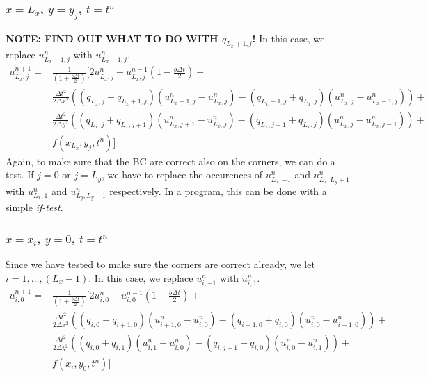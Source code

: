 \documentclass[11pt]{article} %
\newcommand{\Dx}{\Delta x}
\newcommand{\Dy}{\Delta y}
\newcommand{\Dt}{\Delta t}
\newcommand{\unp}{u^{n+1}}
\newcommand{\un}{u^{n}}
\newcommand{\unm}{u^{n-1}}
\begin{document}
\subsubsection{$x=L_x$, $y=y_j$, $t = t^n$}
\textbf{NOTE: FIND OUT WHAT TO DO WITH $q_{L_x+1,j}$!}
In this case, we replace $\un_{L_x+1,j}$ with $\un_{L_x-1,j}$.
\begin{align}
\unp_{L_x,j} = &\frac{1}{\left(1+\frac{b\Dt}{2}\right)}\bigg[ 2\un_{L_x,j} - \unm_{L_x,j}\left(1-\frac{b\Dt}{2}\right) +\nonumber\\
&\frac{\Dt^2}{2\Dx^2}\left((q_{L_x,j} + q_{L_x+1,j})(\un_{L_x-1,j}-\un_{L_x,j}) - (q_{L_x-1,j} + q_{L_x,j})(\un_{L_x,j}-\un_{L_x-1,j})\right) + \nonumber\\
&\frac{\Dt^2}{2\Dy^2}\left((q_{L_x,j} + q_{L_x,j+1})(\un_{L_x,j+1}-\un_{L_x,j}) - (q_{L_x,j-1} + q_{L_x,j})(\un_{L_x,j}-\un_{L_x,j-1})\right) +\nonumber\\
&f(x_{L_x}, y_j, t^n)\bigg]
\end{align}
Again, to make sure that the BC are correct also on the corners, we can do a test. If $j = 0$ or $j=L_y$, we have to replace the occurences of $\un_{L_x,-1}$ and $\un_{L_x,L_y+1}$ with $\un_{L_x,1}$ and $\un_{L_y,L_y-1}$ respectively. In a program, this can be done with a simple \textit{if-test}.

\subsubsection{$x=x_i$, $y=0$, $t=t^n$}
Since we have tested to make sure the corners are correct already, we let $i=1,...,(L_x-1)$.
In this case, we replace $\un_{i,-1}$ with $\un_{i,1}$.
\begin{align}
\unp_{i,0} = &\frac{1}{\left(1+\frac{b\Dt}{2}\right)}\bigg[ 2\un_{i,0} - \unm_{i,0}\left(1-\frac{b\Dt}{2}\right) +\nonumber\\
&\frac{\Dt^2}{2\Dx^2}\left((q_{i,0} + q_{i+1,0})(\un_{i+1,0}-\un_{i,0}) - (q_{i-1,0} + q_{i,0})(\un_{i,0}-\un_{i-1,0})\right) + \nonumber\\
&\frac{\Dt^2}{2\Dy^2}\left((q_{i,0} + q_{i,1})(\un_{i,1}-\un_{i,0}) - (q_{i,j-1} + q_{i,0})(\un_{i,0}-\un_{i,1})\right) +\nonumber\\
&f(x_i, y_0, t^n)\bigg]
\end{align}
\end{document}
